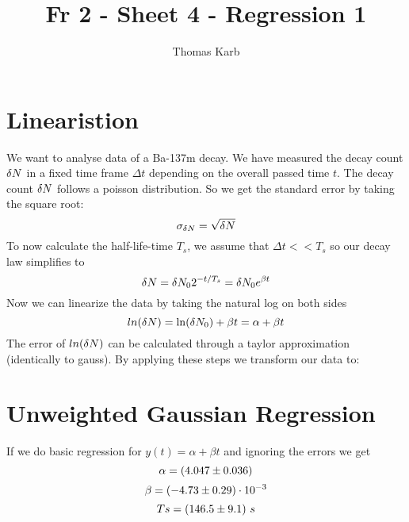 \documentclass[11pt]{article}
\begin{document}
    \author{Thomas Karb}
    \title{Fr 2 - Sheet 4 - Regression 1}
    
    \maketitle
    
    \section{Linearistion}
    
    We want to analyse data of a Ba-137m decay.
    We have measured the decay count $\delta N$ in a fixed time frame $\Delta t$ depending on the overall passed time $t$.
    The decay count $\delta N$ follows a poisson distribution. So we get the standard error by taking the square root:
    \begin{equation*}
        \sigma_{\delta N} = \sqrt {\delta N}
    \end{equation*}
    To now calculate the half-life-time $T_s$, we assume that $\Delta t << T_s$ so our decay law simplifies to
    \begin{equation*}
        \delta N = \delta N_0 2^{-t / T_s} = \delta N_0 e^{\beta t}
    \end{equation*}
    Now we can linearize the data by taking the natural log on both sides
    \begin{equation*}
        ln(\delta N) = \ln(\delta N_0)+\beta t = \alpha + \beta t
    \end{equation*}
    The error of $ln(\delta N)$ can be calculated through a taylor approximation (identically to gauss).
    By applying these steps we transform our data to:
    
    
    
    \section{Unweighted Gaussian Regression}
    If we do basic regression for $y(t) = \alpha + \beta t$ and ignoring the errors we get
    \begin{equation*}
        \alpha = (4.047 \pm 0.036)
    \end{equation*}
    \begin{equation*}
        \beta = (-4.73 \pm 0.29) \cdot 10^{-3}
    \end{equation*}
    \begin{equation*}
        Ts = (146.5 \pm 9.1)\ s
    \end{equation*}
    
\end{document}
